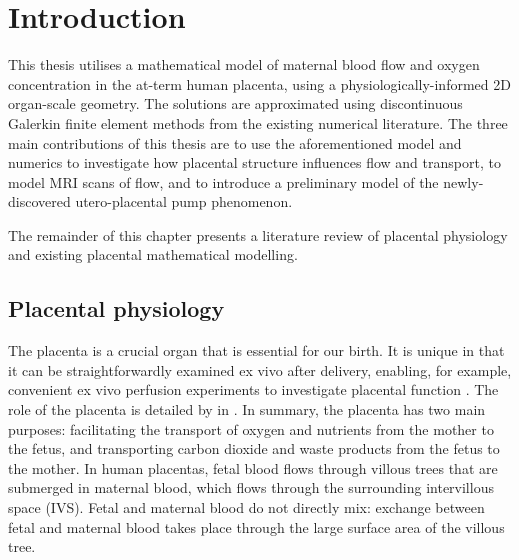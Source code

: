 \chapter{Introduction} \label{sec:introduction}



    This thesis utilises a mathematical model of maternal blood flow and oxygen concentration in the at-term human placenta, using a physiologically-informed 2D organ-scale geometry. The solutions are approximated using discontinuous Galerkin finite element methods from the existing numerical literature. The three main contributions of this thesis are to use the aforementioned model and numerics to investigate how placental structure influences flow and transport, to model MRI scans of flow, and to introduce a preliminary model of the newly-discovered utero-placental pump phenomenon.

    The remainder of this chapter presents a literature review of placental physiology and existing placental mathematical modelling.

    \section{Placental physiology}

        The placenta is a crucial organ that is essential for our birth. It is unique in that it can be straightforwardly examined ex vivo after delivery, enabling, for example, convenient ex vivo perfusion experiments to investigate placental function \cite{lewisPlacentalPerfusionMathematical2020,nyeHumanPlacentalOxygenation2018}. The role of the placenta is detailed by \citeauthor{jensenBloodFlowTransport2019} in \cite{jensenBloodFlowTransport2019}. In summary, the placenta has two main purposes: facilitating the transport of oxygen and nutrients from the mother to the fetus, and transporting carbon dioxide and waste products from the fetus to the mother. In human placentas, fetal blood flows through villous trees that are submerged in maternal blood, which flows through the surrounding intervillous space (IVS). Fetal and maternal blood do not directly mix: exchange between fetal and maternal blood takes place through the large surface area of the villous tree.

